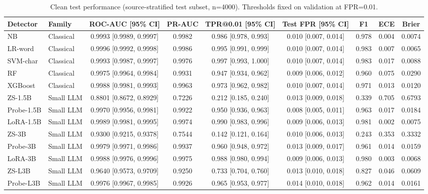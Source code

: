 \begin{table}[t]
\centering
\caption{Clean test performance (source-stratified test subset, n=4000). Thresholds fixed on validation at FPR=0.01.}
\label{tab:clean}
\footnotesize
\begin{tabular}{llccccccc}
\toprule
\textbf{Detector} & \textbf{Family} & \textbf{ROC-AUC [95\% CI]} & \textbf{PR-AUC} & \textbf{TPR@0.01 [95\% CI]} & \textbf{Test FPR [95\% CI]} & \textbf{F1} & \textbf{ECE} & \textbf{Brier} \\
\midrule
NB & Classical & 0.9993 [0.9989, 0.9997] & 0.9982 & 0.986 [0.978, 0.993] & 0.010 [0.007, 0.014] & 0.978 & 0.004 & 0.0074 \\
LR-word & Classical & 0.9996 [0.9992, 0.9998] & 0.9986 & 0.995 [0.991, 0.999] & 0.010 [0.007, 0.014] & 0.983 & 0.007 & 0.0065 \\
SVM-char & Classical & 0.9993 [0.9987, 0.9997] & 0.9976 & 0.997 [0.993, 1.000] & 0.010 [0.007, 0.014] & 0.983 & 0.017 & 0.0088 \\
RF & Classical & 0.9975 [0.9964, 0.9984] & 0.9931 & 0.947 [0.934, 0.962] & 0.009 [0.006, 0.012] & 0.960 & 0.075 & 0.0290 \\
XGBoost & Classical & 0.9988 [0.9981, 0.9993] & 0.9963 & 0.973 [0.962, 0.982] & 0.010 [0.007, 0.014] & 0.971 & 0.013 & 0.0120 \\
ZS-1.5B & Small LLM & 0.8801 [0.8672, 0.8929] & 0.7226 & 0.212 [0.185, 0.240] & 0.013 [0.009, 0.018] & 0.339 & 0.705 & 0.6793 \\
Probe-1.5B & Small LLM & 0.9970 [0.9956, 0.9981] & 0.9922 & 0.950 [0.936, 0.963] & 0.008 [0.005, 0.011] & 0.963 & 0.017 & 0.0184 \\
LoRA-1.5B & Small LLM & 0.9989 [0.9981, 0.9995] & 0.9974 & 0.990 [0.983, 0.996] & 0.009 [0.006, 0.013] & 0.981 & 0.002 & 0.0075 \\
ZS-3B & Small LLM & 0.9300 [0.9215, 0.9378] & 0.7544 & 0.142 [0.121, 0.164] & 0.010 [0.006, 0.013] & 0.243 & 0.353 & 0.3332 \\
Probe-3B & Small LLM & 0.9979 [0.9971, 0.9986] & 0.9937 & 0.960 [0.948, 0.972] & 0.013 [0.009, 0.017] & 0.961 & 0.014 & 0.0159 \\
LoRA-3B & Small LLM & 0.9988 [0.9976, 0.9996] & 0.9975 & 0.988 [0.980, 0.994] & 0.009 [0.006, 0.013] & 0.980 & 0.003 & 0.0068 \\
ZS-L3B & Small LLM & 0.9640 [0.9573, 0.9709] & 0.9250 & 0.733 [0.704, 0.760] & 0.013 [0.010, 0.018] & 0.827 & 0.046 & 0.0609 \\
Probe-L3B & Small LLM & 0.9976 [0.9967, 0.9985] & 0.9926 & 0.965 [0.953, 0.977] & 0.014 [0.010, 0.018] & 0.962 & 0.014 & 0.0161 \\

\end{tabular}
\end{table}
